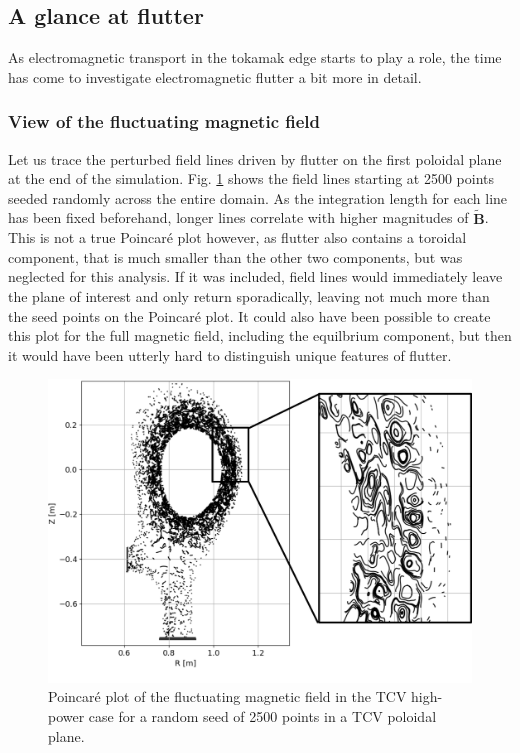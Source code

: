 \subsection{A glance at flutter}

As electromagnetic transport in the tokamak edge starts to play a role, the time has come to investigate electromagnetic flutter a bit more in detail. 

\subsubsection{View of the fluctuating magnetic field}


Let us trace the perturbed field lines driven by flutter on the first poloidal plane at the end of the simulation. Fig. \ref{fig:TCV_poincareFlutter} shows the field lines starting at 2500 points seeded randomly across the entire domain. As the integration length for each line has been fixed beforehand, longer lines correlate with higher magnitudes of $\mathbf{\tilde{B}}$. This is not a true Poincaré plot however, as flutter also contains a toroidal component, that is much smaller than the other two components, but was neglected for this analysis. If it was included, field lines would immediately leave the plane of interest and only return sporadically, leaving not much more than the seed points on the Poincaré plot. It could also have been possible to create this plot for the full magnetic field, including the equilbrium component, but then it would have been utterly hard to distinguish unique features of flutter. \newline 

\begin{figure}[H]\centering
	\centering
	\includegraphics[width=1\textwidth]{schemes/poincareFlutterHighPower.png}
	\caption{Poincaré plot of the fluctuating magnetic field in the TCV high-power case for a random seed of 2500 points in a TCV poloidal plane.}
	\label{fig:TCV_poincareFlutter}	
\end{figure}

